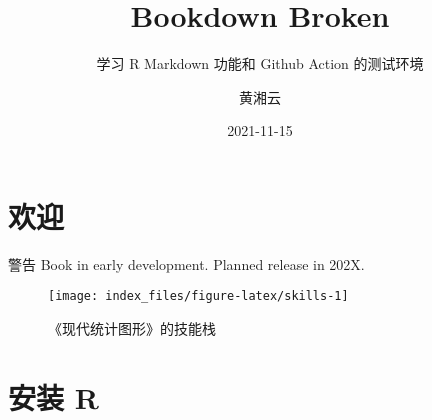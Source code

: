 \documentclass[
  10pt,
  b5paper,
  UTF8,twoside,openany,table]{book}
\title{Bookdown Broken}
\subtitle{学习 R Markdown 功能和 Github Action 的测试环境}
\author{黄湘云}
\date{2021-11-15}
\begin{document}
\maketitle

{
\hypersetup{linkcolor=}
\setcounter{tocdepth}{1}
\tableofcontents
}
\listoftables
\listoffigures
\mainmatter

\hypertarget{welcome}{%
\chapter*{欢迎}\label{welcome}}


\begin{rmdwarn}{警告}
Book in early development. Planned release in 202X.

\end{rmdwarn}

\begin{figure}

{\centering \texttt{[image: index\_files/figure-latex/skills-1]} 

}

\caption{《现代统计图形》的技能栈}\label{fig:skills}
\end{figure}

\hypertarget{appendix}{%
\appendix}


\hypertarget{chap-installation}{%
\chapter{安装 R}\label{chap-installation}}

\backmatter
\printindex

  
\end{document}
